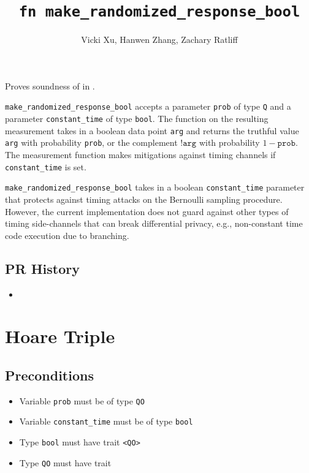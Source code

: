 \documentclass{article}
\title{\texttt{fn make\_randomized\_response\_bool}}
\author{Vicki Xu, Hanwen Zhang, Zachary Ratliff}
\begin{document}
\maketitle

\contrib

Proves soundness of  in .

\texttt{make\_randomized\_response\_bool} accepts a parameter \texttt{prob} of type \texttt{Q} and a parameter \texttt{constant\_time} of type \texttt{bool}.
The function on the resulting measurement takes in a boolean data point \texttt{arg} and returns the truthful value \texttt{arg} with probability \texttt{prob},
or the complement $\texttt{!arg}$ with probability $1 - \texttt{prob}$.
The measurement function makes mitigations against timing channels if \texttt{constant\_time} is set. 

\begin{tcolorbox}
    \begin{warning}
        \texttt{make\_randomized\_response\_bool} takes in a boolean \texttt{constant\_time} parameter that protects against timing attacks on the Bernoulli sampling procedure. 
        However, the current implementation does not guard against other types of timing side-channels that can break differential privacy, e.g., non-constant time code execution due to branching.
    \end{warning}
\end{tcolorbox}

\subsection*{PR History}
\begin{itemize}
    \item {}
\end{itemize}

\section{Hoare Triple}

\subsection*{Preconditions}
\begin{itemize}
    \item Variable \texttt{prob} must be of type \texttt{QO}
    \item Variable \texttt{constant\_time} must be of type \texttt{bool}
    \item Type \texttt{bool} must have trait \texttt{<QO>}
    \item Type \texttt{QO} must have trait 
\end{itemize}
\end{document}
